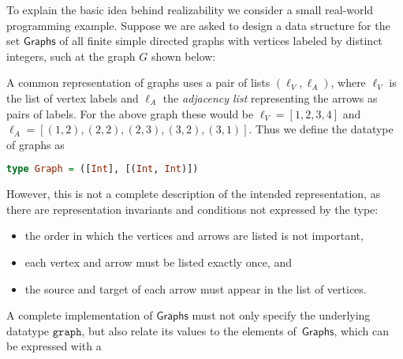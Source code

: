 To explain the basic idea behind realizability we consider a small real-world programming example. Suppose we are asked to design a data structure for the set $\mathsf{Graphs}$ of all finite simple directed graphs with vertices labeled by distinct integers, such at the graph $G$ shown below:
%
\begin{center}
\end{center}
%
A common representation of graphs uses a pair of lists $(\ell_V, \ell_A)$, where $\ell_V$ is the list of vertex labels and $\ell_A$ the \emph{adjacency list} representing the arrows as pairs of labels. For the above graph these would be $\ell_V = [1, 2, 3, 4]$ and $\ell_A = [(1,2), (2,2), (2,3), (3,2), (3,1)]$.
%
Thus we define the datatype of graphs as
%
\begin{lstlisting}[language=Haskell]
type Graph = ([Int], [(Int, Int)])
\end{lstlisting}
%
However, this is not a complete description of the intended representation, as there are representation invariants and conditions not expressed by the type:
%
\begin{itemize}
\item the order in which the vertices and arrows are listed is not
  important,
\item each vertex and arrow must be listed exactly once, and
\item the source and target of each arrow must appear in the list of vertices.
\end{itemize}
%
A complete implementation of $\mathsf{Graphs}$ must not only specify the underlying
datatype $\mathtt{graph}$, but also relate its values to the elements of~$\mathsf{Graphs}$, which can be expressed with a 
